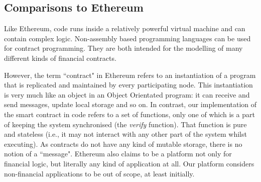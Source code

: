 \documentclass{article}
\begin{document}
\subsection{Comparisons to Ethereum}
Like Ethereum, code runs inside a relatively powerful virtual machine and can contain complex logic. Non-assembly based programming languages can be used for contract programming.  They are both intended for the modelling of many different kinds of financial contracts.

However, the term ``contract" in Ethereum refers to an instantiation of a program that is replicated and maintained by every participating node. This instantiation is very much like an object in an Object Orientated program: it can receive and send messages, update local storage and so on. In contrast, our implementation of the smart contract in code refers to a set of functions, only one of which is a part of keeping the system synchronised (the \textit{verify} function). That function is pure and stateless (i.e., it may not interact with any other part of the system whilst executing).	As contracts do not have any kind of mutable storage, there is no notion of a ``message". Ethereum also claims to be a platform not only for financial logic, but literally any kind of application at all. Our platform considers non-financial applications to be out of scope, at least initially.


\end{document}
